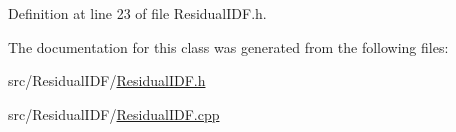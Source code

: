\-Definition at line 23 of file \-Residual\-I\-D\-F.\-h.



\-The documentation for this class was generated from the following files\-:\begin{DoxyCompactItemize}
\item 
src/\-Residual\-I\-D\-F/\hyperlink{ResidualIDF_8h}{\-Residual\-I\-D\-F.\-h}\item 
src/\-Residual\-I\-D\-F/\hyperlink{ResidualIDF_8cpp}{\-Residual\-I\-D\-F.\-cpp}\end{DoxyCompactItemize}
